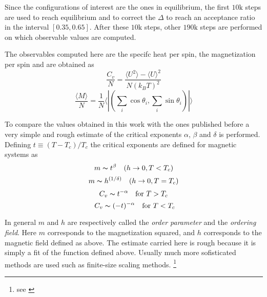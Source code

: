 
Since the configurations of interest are the ones in equilibrium, the first $10\text{k}$
steps are used to reach equilibrium and to correct the $\Delta$ to reach an acceptance
ratio in the interval $[0.35,0.65]$. After these $10\text{k}$ steps, other 
$190\text{k}$ steps are performed on which observable values are computed.

The observables computed here are the specifc heat per spin, the magnetization
per spin and are obtained as 
$$ \frac{C_v}{N} = \frac{\langle U^2 \rangle - \langle U \rangle^2}{N (k_B T)^2} $$
$$ \frac{\langle M \rangle}{N} = \frac{1}{N} \big\langle | (\sum_i \cos \theta_i, 
\sum_i \sin \theta_i ) | \big\rangle$$

To compare the values obtained in this work with the ones published before a very simple
and rough estimate of the critical exponents $\alpha$, $\beta$ and $\delta$ is 
performed. Defining $t \equiv (T - T_c)/T_c$ the critical exponents are defined for
magnetic systems as
$$ m \thicksim t^{\beta} \quad (h \rightarrow 0, T < T_c)$$
$$ m \thicksim h^{(1 / \delta)} \quad (h \rightarrow 0, T=T_c)$$
$$ C_v \thicksim t^{-\alpha} \quad  \text{for}\ T > T_c$$
$$\ C_v \thicksim (-t)^{-\alpha} \quad \text{for}\ T < T_c$$

In general $m$ and $h$ are respectively called the \emph{order parameter} and the
\emph{ordering field}. Here $m$ corresponds to the magnetization squared, and $h$ 
corresponds to the magnetic field defined as above. The estimate carried here is
rough because it is simply a fit of the function defined above. Usually much more
sofisticated methods are used such as finite-size scaling methods. \footnote{
see \cite{1988}}

